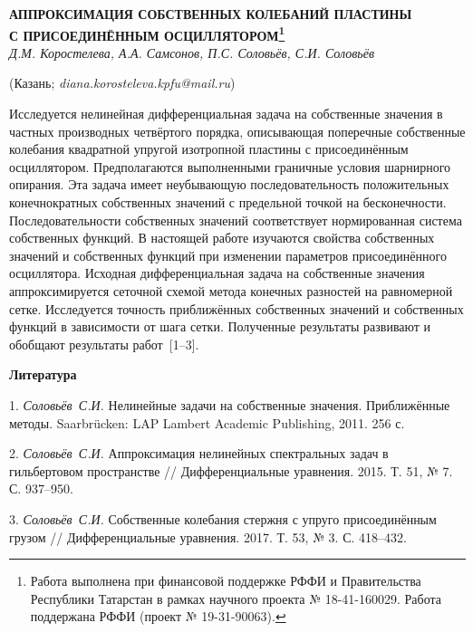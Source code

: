 \begin{center}
    {\bf АППРОКСИМАЦИЯ СОБСТВЕННЫХ КОЛЕБАНИЙ ПЛАСТИНЫ\\ С ПРИСОЕДИНЁННЫМ ОСЦИЛЛЯТОРОМ\footnote{Работа выполнена при финансовой поддержке РФФИ и Правительства Республики Татарстан в рамках научного проекта  № 18-41-160029.
Работа поддержана РФФИ (проект № 19-31-90063).}}\\

    {\it Д.М. Коростелева, А.А. Самсонов, П.С. Соловьёв, С.И. Соловьёв}

    (Казань; {\it diana.korosteleva.kpfu@mail.ru})
\end{center}



Исследуется нелинейная дифференциальная задача на собственные значения в частных производных четвёртого порядка,
описывающая поперечные собственные колебания квадратной упругой изотропной пластины с присоединённым осциллятором.
Предполагаются выполненными граничные условия шарнирного опирания.
Эта задача имеет неубывающую последовательность положительных конечнократных собственных значений
с предельной точкой на бесконечности.
Последовательности собственных значений соответствует нормированная система
собственных функций.
В настоящей работе изучаются свойства собственных значений и собственных функций
при изменении параметров присоединённого осциллятора.
Исходная дифференциальная задача на собственные значения аппроксимируется
сеточной схемой метода конечных разностей на равномерной сетке.
Исследуется точность приближённых собственных значений
и собственных функций в зависимости от шага сетки.
Полученные результаты развивают и обобщают результаты работ~[1--3].



\smallskip \centerline {\bf Литература} \nopagebreak

1. {\it Соловьёв~С.И.}
Нелинейные задачи на собственные значения. Приближённые методы.
Saarbr\"ucken: LAP Lambert Academic Publishing, 2011. 256 с.

2. {\it Соловьёв~С.И.}
Аппроксимация нелинейных спектральных задач в гильбертовом пространстве
// Дифференциальные уравнения. 2015. Т. 51,
№ 7. С. 937--950.

3. {\it Соловьёв~С.И.}
Собственные колебания стержня с упруго присоединённым грузом
// Дифференциальные уравнения. 2017. Т. 53,
№ 3. С. 418--432.





